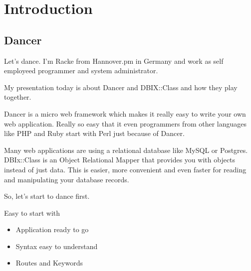
\section{Introduction}


\subsection{Dancer}

Let's dance. I'm Racke from Hannover.pm in Germany and work
as self employeed programmer and system administrator.

My presentation today is about Dancer and DBIX::Class and how they play
together.

Dancer is a micro web framework which makes it really easy
to write your own web application. Really so easy that it even
programmers from other languages like PHP and Ruby start with Perl
just because of Dancer.

Many web applications are using a relational database like MySQL
or Postgres. DBIx::Class is an Object Relational Mapper that provides
you with objects instead of just data. This is easier, more convenient 
and even faster for reading and manipulating your database records.

So, let's start to dance first.
 
\begin{frame}{Easy to start with}
\begin{itemize}
\item Application ready to go
\item Syntax easy to understand
\item Routes and Keywords
\end{itemize}
\end{frame}

